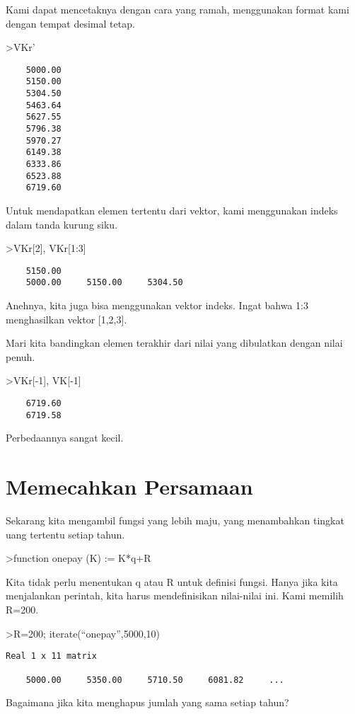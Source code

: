\documentclass[
]{book}
\begin{document}
Kami dapat mencetaknya dengan cara yang ramah, menggunakan format kami dengan tempat desimal tetap.

\textgreater VKr'

\begin{verbatim}
    5000.00 
    5150.00 
    5304.50 
    5463.64 
    5627.55 
    5796.38 
    5970.27 
    6149.38 
    6333.86 
    6523.88 
    6719.60 
\end{verbatim}

Untuk mendapatkan elemen tertentu dari vektor, kami menggunakan indeks dalam tanda kurung siku.

\textgreater VKr{[}2{]}, VKr{[}1:3{]}

\begin{verbatim}
    5150.00 
    5000.00     5150.00     5304.50 
\end{verbatim}

Anehnya, kita juga bisa menggunakan vektor indeks. Ingat bahwa 1:3 menghasilkan vektor {[}1,2,3{]}.

Mari kita bandingkan elemen terakhir dari nilai yang dibulatkan dengan nilai penuh.

\textgreater VKr{[}-1{]}, VK{[}-1{]}

\begin{verbatim}
    6719.60 
    6719.58 
\end{verbatim}

Perbedaannya sangat kecil.

\chapter{Memecahkan Persamaan}\label{memecahkan-persamaan}

Sekarang kita mengambil fungsi yang lebih maju, yang menambahkan tingkat uang tertentu setiap tahun.

\textgreater function onepay (K) := K*q+R

Kita tidak perlu menentukan q atau R untuk definisi fungsi. Hanya jika kita menjalankan perintah, kita harus mendefinisikan nilai-nilai ini. Kami memilih R=200.

\textgreater R=200; iterate(``onepay'',5000,10)

\begin{verbatim}
Real 1 x 11 matrix

    5000.00     5350.00     5710.50     6081.82     ...
\end{verbatim}

Bagaimana jika kita menghapus jumlah yang sama setiap tahun?
\end{document}
